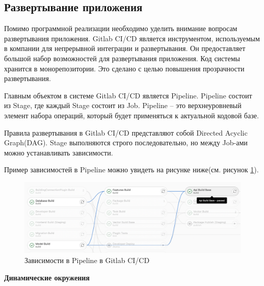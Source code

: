 \subsection{\large{Развертывание приложения}}

Помимо программной реализации необходимо уделить внимание вопросам развертывания приложения.
Gitlab CI/CD является инструментом, используемым в компании для непрерывной интеграции и развертывания.
Он предоставляет большой набор возможностей для развертывания приложения.
Код системы хранится в монорепозитории.
Это сделано с целью повышения прозрачности развертывания.

Главным объектом в системе Gitlab CI/CD является Pipeline.
Pipeline состоит из Stage, где каждый Stage состоит из Job.
Pipeline -- это верхнеуровневый элемент набора операций,
который будет применяться к актуальной кодовой базе.

Правила развертывания в Gitlab CI/CD представляют собой Directed Acyclic Graph(DAG).
Stage выполняются строго последовательно, но между Job-ами можно устанавливать зависимости.

Пример зависимостей в Pipeline можно увидеть на рисунке ниже(см. рисунок \ref{pic:implementation__deployment-dependencies}).
\begin{figure}[H]
	\includegraphics[width=\textwidth]{implementation/pictures/deployment/dependencies}
	\caption{Зависимости в Pipeline в Gitlab CI/CD}
	\label{pic:implementation__deployment-dependencies}
\end{figure}
\vskip 10mm

\noindent \textbf{Динамические окружения}

